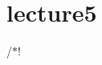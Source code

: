 \chapter{lecture5 }
\hypertarget{md_lecture-notes_2lecture5}{}\label{md_lecture-notes_2lecture5}
/\texorpdfstring{$\ast$}{*}! 